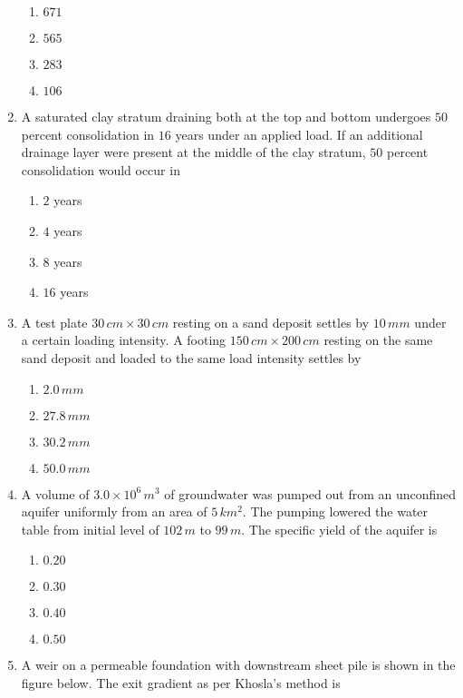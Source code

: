 \documentclass[journal]{IEEEtran}
\begin{document}
\begin{enumerate}
    \begin{enumerate}
        \item $671$
        \item $565$
        \item $283$
        \item $106$
    \end{enumerate}
    \item A saturated clay stratum draining both at the top and bottom undergoes $50$ percent consolidation in $16$ years under an applied load. If an additional drainage layer were present at the middle of the clay stratum, $50$ percent consolidation would occur in 
    \begin{enumerate}
        \item $2$ years
        \item $4$ years
        \item $8$ years
        \item $16$ years
    \end{enumerate}
    \item A test plate $30\,cm\times 30\,cm$ resting on a sand deposit settles by $10\,mm$ under a certain loading intensity. A footing $150\,cm\times 200\,cm$ resting on the same sand deposit and loaded to the same load intensity settles by
    \begin{enumerate}
        \item $2.0\,mm$
        \item $27.8\,mm$
        \item $30.2\,mm$
        \item $50.0\,mm$
    \end{enumerate}
    \item A volume of $3.0\times 10^6\,m^3$ of groundwater was pumped out from an unconfined aquifer uniformly from an area of $5\,km^2$. The pumping lowered the water table from initial level of $102\,m$ to $99\,m$. The specific yield of the aquifer is
    \begin{enumerate}
        \item $0.20$
        \item $0.30$
        \item $0.40$
        \item $0.50$
    \end{enumerate}
    \item A weir on a permeable foundation with downstream sheet pile is shown in the figure below. The exit gradient as per Khosla's method is 
    \begin{circuitikz}[scale=0.8]

\end{circuitikz}
\end{enumerate}
\end{document}
